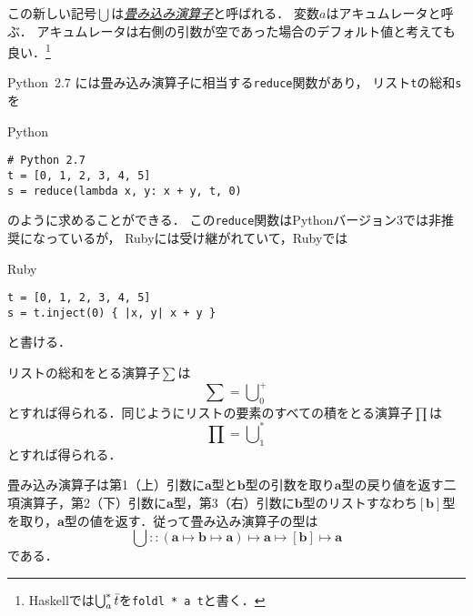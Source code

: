 \documentclass[a5paper,draft]{jsbook}
\newcommand{\programminglanguage}[1]{\textsf{#1}}
\newcommand{\haskell}{\programminglanguage{Haskell}}
\newcommand{\python}{\programminglanguage{Python}}
\newcommand{\ruby}{\programminglanguage{Ruby}}
\newcommand{\keyword}[1]{{\underline{\emph{#1}}}}
\newcommand{\code}[1]{\texttt{#1}}
\newenvironment{pythoncode}{\begin{itembox}[r]{\python}}{\end{itembox}}
\newenvironment{rubycode}{\begin{itembox}[r]{\ruby}}{\end{itembox}}
\newcommand{\mathTypeParameter}[1]{\mathbf{#1}}
\newcommand{\mathListVar}[1]{\Bar{#1}}
\newcommand{\mathListType}[1]{\left[#1\right]}
\DeclareMathOperator*{\mathFold}{\bigcup}
\newcommand{\mathIn}{\mathrel{::}}
\newcommand{\mathMapsTo}{\mapsto}
\newcommand{\mathMorphII}[3]{#1\mathMapsTo#2\mathMapsTo#3}
\newcommand{\mathMorphIII}[4]{#1\mathMapsTo#2\mathMapsTo#3\mathMapsTo#4}
\begin{document}
この新しい記号$\mathFold$は\keyword{畳み込み演算子}と呼ばれる．
変数$a$はアキュムレータと呼ぶ．
アキュムレータは右側の引数が空であった場合のデフォルト値と考えても良い．\footnote{\haskell では$\mathFold^{*}_{a}\mathListVar{t}$を\code{foldl * a t}と書く．}

\python\ 2.7 には畳み込み演算子に相当する\code{reduce}関数があり，
リスト\code{t}の総和\code{s}を
\begin{pythoncode}
\begin{verbatim}
# Python 2.7
t = [0, 1, 2, 3, 4, 5]
s = reduce(lambda x, y: x + y, t, 0)
\end{verbatim}
\end{pythoncode}
のように求めることができる．
この\code{reduce}関数は\python バージョン3では非推奨になっているが，
\ruby には受け継がれていて，\ruby では
\begin{rubycode}
\begin{verbatim}
t = [0, 1, 2, 3, 4, 5]
s = t.inject(0) { |x, y| x + y }
\end{verbatim}
\end{rubycode}
と書ける．

リストの総和をとる演算子$\sum$は
\begin{equation}
\sum=\mathFold^+_0
\end{equation}
とすれば得られる．同じようにリストの要素のすべての積をとる演算子$\prod$は
\begin{equation}
\prod=\mathFold^*_1
\end{equation}
とすれば得られる．

畳み込み演算子は第1（上）引数に$\mathTypeParameter{a}$型と$\mathTypeParameter{b}$型の引数を取り$\mathTypeParameter{a}$型の戻り値を返す二項演算子，第2（下）引数に$\mathTypeParameter{a}$型，第3（右）引数に$\mathTypeParameter{b}$型のリストすなわち$\mathListType{\mathTypeParameter{b}}$型を取り，$\mathTypeParameter{a}$型の値を返す．従って畳み込み演算子の型は
\begin{equation}
\mathFold\mathIn\mathMorphIII{(\mathMorphII{\mathTypeParameter{a}}{\mathTypeParameter{b}}{\mathTypeParameter{a}})}{\mathTypeParameter{a}}{\mathListType{\mathTypeParameter{b}}}{\mathTypeParameter{a}}
\end{equation}
である．
\end{document}
